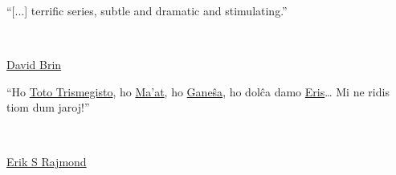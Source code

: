 \makeatletter
\newlength{\beforeblurbskip}
  \setlength{\beforeblurbskip}{.5\baselineskip}
\newlength{\afterblurbskip}
  \setlength{\afterblurbskip}{.5\baselineskip}
\newlength{\blurbwidth}
  \setlength{\blurbwidth}{.6\textwidth}
\newlength{\blurbrule}
  \setlength{\blurbrule}{.4\p@}
\newcommand{\blurbsize}{\small}
\newcommand{\blurbflush}{flushright}

\newcommand{\blurbfontsize}[1]{\def\blurbsize{#1}}
\newcommand{\blurbposition}[1]{\long\def\blurbflush{#1}}
\newcommand{\blurbtextposition}[1]{\def\textflush{#1}}
\newcommand{\blurbsourceposition}[1]{\def\sourceflush{#1}}

\newcommand{\@blurbrule}{\rule[.5ex]{\blurbwidth}{\blurbrule}}

\newcommand{\@blurbtext}[1]{%
  \begin{minipage}{\blurbwidth}\begin{\textflush} #1\par
    \ifdim\blurbrule>\z@ \@blurbrule \else \vspace*{1ex} \fi
  \end{\textflush}\end{minipage}}

  \newcommand{\@blurbsource}[1]{%
  \begin{minipage}{\blurbwidth}
    \begin{\sourceflush} #1\par
  \end{\sourceflush}\end{minipage}}

\newcommand{\blurb}[2]{
	\vspace{\beforeblurbskip}
	{\blurbsize
	\begin{\blurbflush}
		\begin{minipage}{8cm} \@blurbtext{#1}\\ \@blurbsource{#2} \end{minipage}
	\end{\blurbflush}
	\vspace{\afterblurbskip}}}
\makeatother

\thispagestyle{empty}
\blurb{“[...] terrific series, subtle and dramatic and stimulating.”}{\href{https://wikipedia.org/wiki/David_Brin}{David Brin}}
\blurb{“Ho \href{https://eo.wikipedia.org/wiki/Hermeso_Trismegisto}{Toto Trismegisto}, ho \href{https://eo.wikipedia.org/wiki/Maat}{Ma’at}, ho \href{https://eo.wikipedia.org/wiki/Gane\%C5\%9Do}{Ganeŝa}, ho dolĉa damo \href{https://eo.wikipedia.org/wiki/Diskordianismo#Eris}{Eris}… Mi ne ridis tiom dum jaroj!”}{\href{https://eo.wikipedia.org/wiki/Eric_S._Raymond}{Erik S Rajmond}}
\thispagestyle{empty}
